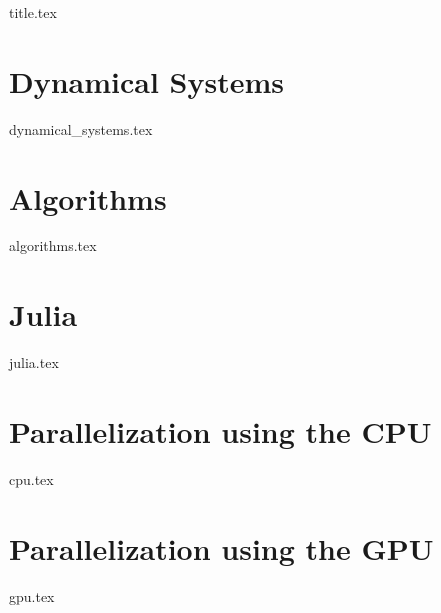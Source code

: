 \documentclass[12pt,a4paper,twoside]{article}
\numberwithin{figure}{section}
\theoremstyle{definition}
\theoremstyle{remark}
\theoremstyle{remark}
\begin{document}
{title.tex}

\newpage
\tableofcontents
\newpage

\pagestyle{headings}

\section{Dynamical Systems}
{dynamical_systems.tex}
\section{Algorithms}
{algorithms.tex}
\section{Julia}
{julia.tex}
\section{Parallelization using the CPU}
{cpu.tex}
\section{Parallelization using the GPU}
{gpu.tex}

\end{document}
